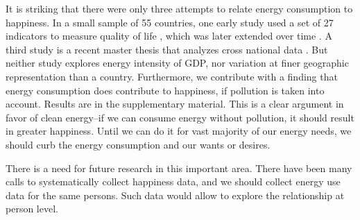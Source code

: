 \documentclass[10pt, letterpaper]{article}
\begin{document}
\begin{spacing}{1.0}
It is striking that there were only three  attempts to
relate energy consumption to happiness.   %
 In a small sample of 55 countries, one early study used a set of 27 indicators to measure
 quality of life \citep{mazur74}, which was later extended over time \citep{mazur11}.
 A third study is a recent master
 thesis that  analyzes cross national data \citep{winfrey13}. But neither
 study  explores energy intensity of GDP, nor variation at finer geographic representation than a country.
Furthermore, we contribute with a finding that energy consumption does contribute to happiness, if pollution is
taken into account. Results are in the supplementary material. This is a clear argument in favor of clean energy--if we can
consume energy without pollution, it should result in greater happiness. Until
we can do it for vast majority of our energy needs, we should curb the energy consumption and
our wants or desires.

There is a need for future research in this important area. There have been many
calls to systematically collect happiness data, and we should collect energy use data for the same persons. Such data would allow
to explore the relationship  at person level. %




\end{spacing}
\end{document}
